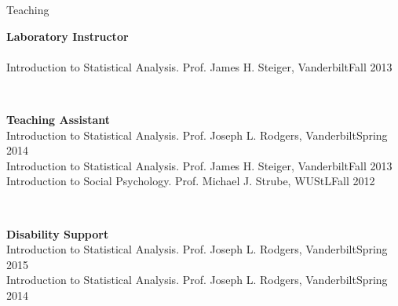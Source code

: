 \begin{rSection}{\textrm{Teaching}}
\begin{minipage}{\linewidth}{\large {\bf Laboratory Instructor}\\}
\smallskip\\
Introduction to Statistical Analysis. Prof. James H. Steiger, Vanderbilt\hfill  {Fall 2013}%
\end{minipage}
\medskip\\
\begin{minipage}{\linewidth}{\large {\bf Teaching Assistant}}\\
Introduction to Statistical Analysis. Prof. Joseph L. Rodgers, Vanderbilt\hfill  {Spring 2014}\smallskip\\
Introduction to Statistical Analysis. Prof. James H. Steiger, Vanderbilt\hfill  {Fall 2013}\smallskip\\
Introduction to Social Psychology. Prof. Michael J. Strube, WUStL\hfill{Fall 2012}\end{minipage}\medskip\\
\begin{minipage}{\linewidth}{\large {\bf Disability Support}}\\
Introduction to Statistical Analysis. Prof. Joseph L. Rodgers, Vanderbilt\hfill  {Spring 2015}\smallskip\\
Introduction to Statistical Analysis. Prof. Joseph L. Rodgers, Vanderbilt\hfill{Spring 2014}\end{minipage}
\end{rSection}